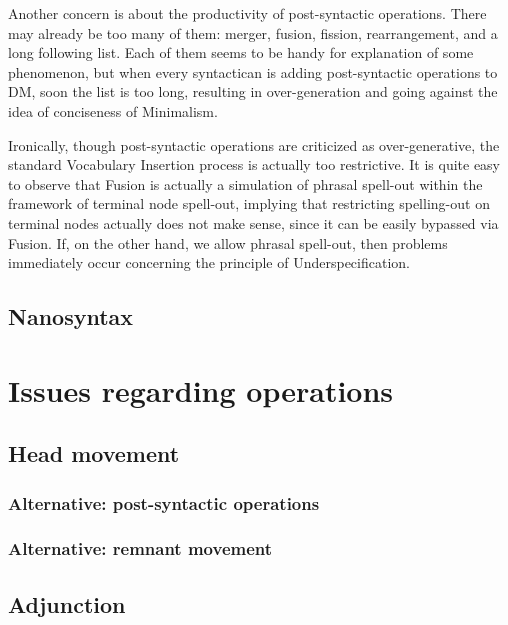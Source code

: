 \documentclass[a4paper]{article}
\begin{document}

Another concern is about the productivity of post-syntactic operations.
There may already be too many of them: merger, fusion, fission, rearrangement, and a long following list.
Each of them seems to be handy for explanation of some phenomenon, but when every syntactican is adding post-syntactic operations to DM, soon the list is too long, resulting in over-generation and going against the idea of conciseness of Minimalism.

Ironically, though post-syntactic operations are criticized as over-generative, the standard Vocabulary Insertion process is actually too restrictive.
It is quite easy to observe that Fusion is actually a simulation of phrasal spell-out within the framework of terminal node spell-out, implying that restricting spelling-out on terminal nodes actually does not make sense, since it can be easily bypassed via Fusion.
If, on the other hand, we allow phrasal spell-out, then problems immediately occur concerning the principle of Underspecification.

\subsection{Nanosyntax}

\section{Issues regarding operations}\label{sec:issue-op}

\subsection{Head movement}


\subsubsection{Alternative: post-syntactic operations}

\subsubsection{Alternative: remnant movement}

\subsection{Adjunction}
\end{document}
